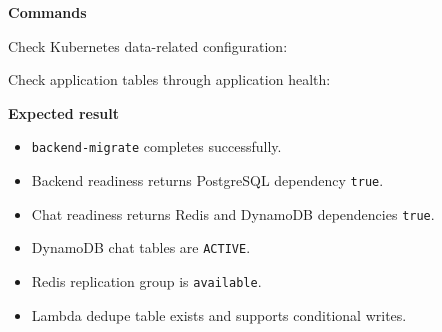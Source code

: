 \vspace{0.5em}\noindent\textbf{Commands}\par

Check Kubernetes data-related configuration:

\begin{Shaded}
\begin{Highlighting}[]
\end{Highlighting}
\end{Shaded}

Check application tables through application health:

\begin{Shaded}
\begin{Highlighting}[]
\OperatorTok{=}
\OperatorTok{=}
 
 
\end{Highlighting}
\end{Shaded}

\vspace{0.5em}\noindent\textbf{Expected result}\par

\begin{itemize}
\tightlist
\item
  \texttt{backend-\allowbreak{}migrate} completes successfully.
\item
  Backend readiness returns PostgreSQL dependency \texttt{true}.
\item
  Chat readiness returns Redis and DynamoDB dependencies \texttt{true}.
\item
  DynamoDB chat tables are \texttt{ACTIVE}.
\item
  Redis replication group is \texttt{available}.
\item
  Lambda dedupe table exists and supports conditional writes.
\end{itemize}

